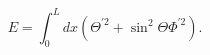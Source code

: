\begin{equation*}
  E=\int_0^L dx\left(\Theta^{\prime2}+\sin^2\Theta\Phi^{\prime2}\right).
\end{equation*}

